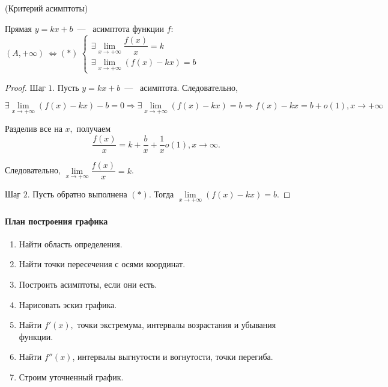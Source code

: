 \begin{theorem}
	\hypertarget{thrm5.29}{(Критерий асимптоты)} 
	
	Прямая $y = kx + b$~---~ асимптота функции $f$: $(A, +\infty) \ \Leftrightarrow (*)\ \begin{cases}
		\exists \lim\limits_{x \to +\infty} \dfrac{f(x)}{x} = k \\
		\exists \lim\limits_{x\to +\infty} (f(x) - kx) = b
		\end{cases}$
\end{theorem}
\begin{proof}
	$\underline{\textrm{Шаг 1.}}$ Пусть $y = kx + b$~---~ асимптота. Следовательно, 
	
	$$\exists \lim\limits_{x\to +\infty} (f(x) - kx) -b = 0 \Rightarrow \exists \lim\limits_{x\to +\infty} (f(x) - kx) = b \Rightarrow f(x) -kx = b + o(1), x\to +\infty$$
	
	Разделив все на $x,$ получаем 
	$$\dfrac{f(x)}{x} = k + \dfrac{b}{x} + \dfrac{1}{x}o(1), x\to \infty.$$ 
	
	Следовательно, $\lim\limits_{x \to +\infty} \dfrac{f(x)}{x} = k$.
	
	 $\underline{\textrm{Шаг 2.}}$ Пусть обратно выполнена $(*)$. Тогда $\lim\limits_{x\to +\infty} (f(x) - kx) = b.$
\end{proof}

\paragraph{План построения графика}
\begin{enumerate}
	\item Найти область определения.
	\item Найти точки пересечения с осями координат.
	\item Построить асимптоты, если они есть.
	\item Нарисовать эскиз графика.
	\item Найти $f'(x),$ точки экстремума, интервалы возрастания и убывания функции.
	\item Найти $f''(x)$, интервалы выгнутости и вогнутости, точки перегиба.
	\item Строим уточненный график.
\end{enumerate}


